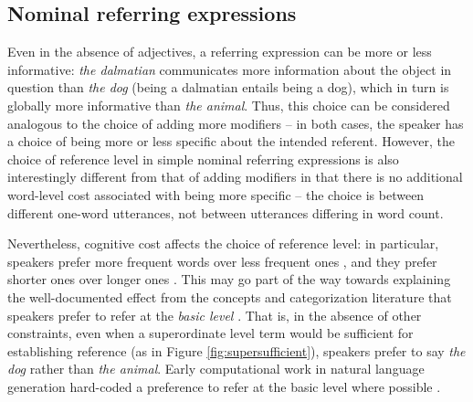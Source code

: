 \documentclass[11pt]{article}
\newcommand{\figref}[1]{Figure \ref{#1}}
\begin{document}
\subsection{Nominal referring expressions}
\label{sec:nominalintro}

Even in the absence of adjectives, a referring expression can be more or less informative: \emph{the dalmatian} communicates more information about the object in question than \emph{the dog} (being a dalmatian entails being a dog), which in turn is globally more informative than \emph{the animal}. 
Thus, this choice can be considered analogous to the choice of adding more modifiers -- in both cases, the speaker has a choice of being more or less specific about the intended referent. However, the choice of reference level in simple nominal referring expressions is also interestingly different from that of adding modifiers in that there is no additional word-level cost associated with being more specific -- the choice is between different one-word utterances, not between utterances differing in word count. 

Nevertheless, cognitive cost affects the choice of reference level: in particular, speakers prefer more frequent words over less frequent ones \cite{oldfield1965response}, and they prefer shorter ones over longer ones \cite{degen2013cost, rohde2012}. This may go part of the way towards explaining the well-documented effect from the concepts and categorization literature that speakers prefer to refer at the \emph{basic level} \cite{Rosch1976, Tanaka1991}. That is, in the absence of other constraints, even when a superordinate level term would be sufficient for establishing reference (as in \figref{fig:supersufficient}), speakers prefer to say \emph{the dog} rather than \emph{the animal}. Early computational work in natural language generation hard-coded a preference to refer at the basic level where possible \cite{dale1995}.
\end{document}
